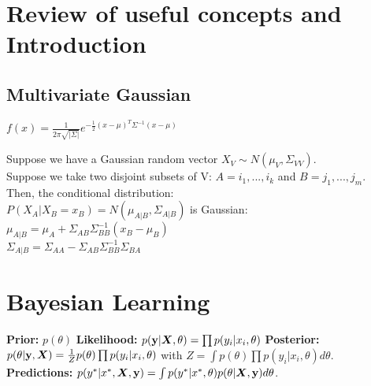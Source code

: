 \section{Review of useful concepts and Introduction}
\subsection{Multivariate Gaussian}
$f(x) = \frac{1}{2\pi \sqrt{|\Sigma|}} e^{- \frac{1}{2} (x-\mu)^T \Sigma^{-1} (x-\mu)}$

Suppose we have a Gaussian random vector $X_V \sim N(\mu_V, \Sigma_{VV})$.\\
Suppose we take two disjoint subsets of V: $A={i_1,...,i_k}$ and $B={j_1,...,j_m}$.\\
Then, the conditional distribution: \\
$P(X_A|X_B=x_B)=N(\mu_{A|B}, \Sigma_{A|B})$ is Gaussian:\\
$\mu_{A|B}=\mu_A+\Sigma_{AB}\Sigma^{-1}_{BB}(x_B-\mu_B)$\\
$\Sigma_{A|B}=\Sigma_{AA}-\Sigma_{AB}\Sigma^{-1}_{BB}\Sigma_{BA}$

\section{Bayesian Learning}
\textbf{Prior:} $p(\theta)$
\textbf{Likelihood:} $p({\mathbf{y}}|{\bm{X}},\theta) = \prod p(y_i|x_i,\theta)$
\textbf{Posterior:} $p(\theta|{\mathbf{y}},{\bm{X}}) = \frac{1}{Z}p(\theta)\prod p(y_i|x_i, \theta)$ with $Z = \int p(\theta)\prod p(y_i|x_i, \theta) d\theta$.
\textbf{Predictions:} $p(y^*|x^*,{\bm{X}},{\mathbf{y}}) = \int p(y^*|x^*,\theta)p(\theta|{\bm{X}}, {\mathbf{y}}) d\theta$. 


